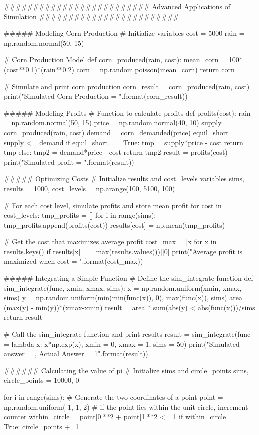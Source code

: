 ######################### Advanced Applications of Simulation  ########################

##### Modeling Corn Production
# Initialize variables
cost = 5000
rain = np.random.normal(50, 15)

# Corn Production Model
def corn_produced(rain, cost):
  mean_corn = 100*(cost**0.1)*(rain**0.2)
  corn = np.random.poisson(mean_corn)
  return corn

# Simulate and print corn production
corn_result = corn_produced(rain, cost)
print("Simulated Corn Production = {}".format(corn_result))

##### Modeling Profits
# Function to calculate profits
def profits(cost):
    rain = np.random.normal(50, 15)
    price = np.random.normal(40, 10)
    supply = corn_produced(rain, cost)
    demand = corn_demanded(price)
    equil_short = supply <= demand
    if equil_short == True:
        tmp = supply*price - cost
        return tmp
    else:
        tmp2 = demand*price - cost
        return tmp2
result = profits(cost)
print("Simulated profit = {}".format(result))

##### Optimizing Costs
# Initialize results and cost_levels variables
sims, results = 1000, {}
cost_levels = np.arange(100, 5100, 100)

# For each cost level, simulate profits and store mean profit
for cost in cost_levels:
    tmp_profits = []
    for i in range(sims):
        tmp_profits.append(profits(cost))
    results[cost] = np.mean(tmp_profits)
    
# Get the cost that maximizes average profit
cost_max = [x for x in results.keys() if results[x] == max(results.values())][0]
print("Average profit is maximized when cost = {}".format(cost_max))

##### Integrating a Simple Function
# Define the sim_integrate function
def sim_integrate(func, xmin, xmax, sims):
    x = np.random.uniform(xmin, xmax, sims)
    y = np.random.uniform(min(min(func(x)), 0), max(func(x)), sims)
    area = (max(y) - min(y))*(xmax-xmin)
    result = area * sum(abs(y) < abs(func(x)))/sims
    return result

# Call the sim_integrate function and print results
result = sim_integrate(func = lambda x: x*np.exp(x), xmin = 0, xmax = 1, sims = 50)
print("Simulated answer = {}, Actual Answer = 1".format(result))

###### Calculating the value of pi
# Initialize sims and circle_points
sims, circle_points = 10000, 0 

for i in range(sims):
    # Generate the two coordinates of a point
    point = np.random.uniform(-1, 1, 2)
    # if the point lies within the unit circle, increment counter
    within_circle = point[0]**2 + point[1]**2 <= 1
    if within_circle == True:
        circle_points +=1
        
